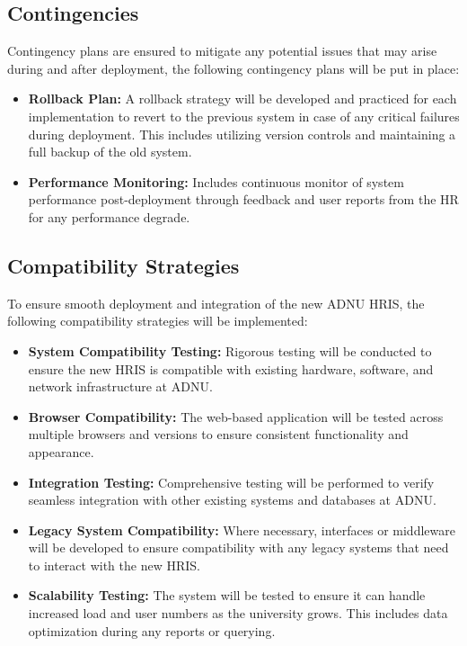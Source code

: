     \subsection{Contingencies}
    
    Contingency plans are ensured to mitigate any potential issues that may arise during and after deployment, the following contingency plans will be put in place:

    \begin{itemize}
        \item[] \textbf{Rollback Plan:} A rollback strategy will be developed and practiced for each implementation to revert to the previous system in case of any critical failures during deployment. This includes utilizing version controls and maintaining a full backup of the old system.

        \item[] \textbf{Performance Monitoring:} Includes continuous monitor of system performance post-deployment through feedback and user reports from the HR for any performance degrade.
    \end{itemize}

    \subsection{Compatibility Strategies}
 
    To ensure smooth deployment and integration of the new ADNU HRIS, the following compatibility strategies will be implemented:
    
    \begin{itemize}
        \item[] \textbf{System Compatibility Testing:} Rigorous testing will be conducted to ensure the new HRIS is compatible with existing hardware, software, and network infrastructure at ADNU.
        
        \item[] \textbf{Browser Compatibility:} The web-based application will be tested across multiple browsers and versions to ensure consistent functionality and appearance.
        
        \item[] \textbf{Integration Testing:} Comprehensive testing will be performed to verify seamless integration with other existing systems and databases at ADNU.
        
        \item[] \textbf{Legacy System Compatibility:} Where necessary, interfaces or middleware will be developed to ensure compatibility with any legacy systems that need to interact with the new HRIS.
        
        \item[] \textbf{Scalability Testing:} The system will be tested to ensure it can handle increased load and user numbers as the university grows. This includes data optimization during any reports or querying. 
    \end{itemize}
    

